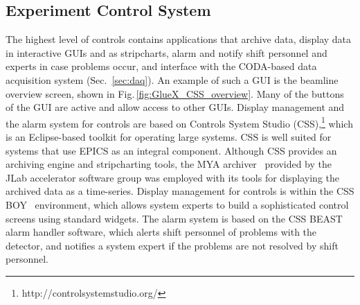 \subsection{Experiment Control System \label{sec:alarms}}
The highest level of controls contains applications that archive data, display data in interactive GUIs and as stripcharts, alarm and notify shift personnel and experts in case problems occur, and interface with the CODA-based data acquisition system (Sec.~\ref{sec:daq}).
An example of such a GUI is the beamline overview screen, shown in Fig.\,\ref{fig:GlueX_CSS_overview}. Many of the buttons of the GUI are active and allow access to other GUIs.
Display management and the alarm system for \gx{} controls are based on Controls System Studio (CSS),\footnote{http://controlsystemstudio.org/}  which is an Eclipse-based toolkit for operating large systems. CSS is well suited for systems that use EPICS as an integral component. Although CSS provides an archiving engine and stripcharting tools, the MYA archiver~\cite{Slominski:2009icaleps} provided by the JLab accelerator software group was employed with its tools for displaying the archived data as a time-series. Display management for \gx{} controls is within the CSS BOY~\cite{Chen:2011icaleps} environment, which allows system experts to build a sophisticated control screens using standard widgets. The alarm system is based on the CSS BEAST\cite{Kasemir:2009icaleps} alarm handler software, which alerts shift personnel of problems with the detector, and notifies a system expert if the problems are not resolved by shift personnel. 